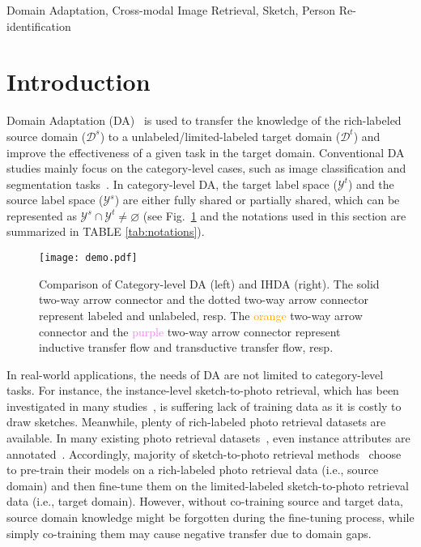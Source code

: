 \documentclass[journal]{IEEEtran}
\begin{document}
\begin{IEEEkeywords}
Domain Adaptation, Cross-modal Image Retrieval, Sketch, Person Re-identification
\end{IEEEkeywords}



\section{Introduction}
\label{sec:intro}
Domain Adaptation (DA)~\cite{pan2010survey} is used to transfer the knowledge of the rich-labeled source domain ($\mathcal{D}^{s}$) to a unlabeled/limited-labeled target domain ($\mathcal{D}^{t}$) and improve the effectiveness of a given task in the target domain. Conventional DA studies mainly focus on the category-level cases, such as image classification and segmentation tasks~\cite{pei2018multi,rozantsev2018beyond,cao2018partial,zou2019consensus,zou2018unsupervised}. In category-level DA, the target label space ($\mathcal{Y}^{t}$) and the source label space ($\mathcal{Y}^{s}$) are either fully shared or partially shared, which can be represented as $\mathcal{Y}^{s} \cap \mathcal{Y}^{t} \!\neq\! \varnothing$ (see Fig.~\ref {fig:demo} and the notations used in this section are summarized in TABLE \ref{tab:notations}). 

\begin{figure}[t]
\centering
  \texttt{[image: demo.pdf]}
  \caption{Comparison of Category-level DA (left) and IHDA (right). The solid two-way arrow connector and the dotted two-way arrow connector represent labeled and unlabeled, resp. The \textcolor{orange}{orange} two-way arrow connector and the \textcolor{violet}{purple} two-way arrow connector represent inductive transfer flow and transductive transfer flow, resp. }
  \label{fig:demo}
\end{figure}


In real-world applications, the needs of DA are not limited to category-level tasks. For instance, the instance-level sketch-to-photo retrieval, which has been investigated in many studies~\cite{pang2018cross,ouyang2016forgetmenot,wang2015sketch,yu2016sketch,zhang2016sketch,bhattacharjee2018query,choi2019sketchhelper,wang2020beyond}, is suffering lack of training data as it is costly to draw sketches. Meanwhile, plenty of rich-labeled photo retrieval datasets are available. In many existing photo retrieval datasets~\cite{semjitter,liu2015faceattributes,zheng2015scalable,wang2019incremental,zeng2020illumination}, even instance attributes are annotated~\cite{wang2015multi,wang2018incremental}. Accordingly, majority of sketch-to-photo retrieval methods~\cite{yu2016sketch,song2016deep,song2017deep,pang2018cross,wu2018light,wu2018coupled,deng2019residual} choose to pre-train their models on a rich-labeled photo retrieval data (i.e., source domain) and then fine-tune them on the limited-labeled sketch-to-photo retrieval data (i.e., target domain). However, without co-training source and target data, source domain knowledge might be forgotten during the fine-tuning process, while simply co-training them may cause negative transfer due to domain gaps.
\end{document}
